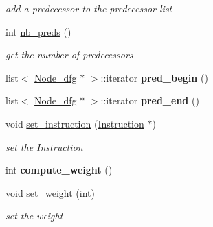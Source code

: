 \begin{DoxyCompactItemize}
\begin{DoxyCompactList}\small\item\em add a predecessor to the predecessor list \end{DoxyCompactList}\item 
\mbox{\label{class_node__dfg_adef5e6e3362133f6adb38d404c8d8cf6}} 
int \mbox{\hyperlink{class_node__dfg_adef5e6e3362133f6adb38d404c8d8cf6}{nb\+\_\+preds}} ()
\begin{DoxyCompactList}\small\item\em get the number of predecessors \end{DoxyCompactList}\item 
\mbox{\label{class_node__dfg_a769af0d7836679d6ee9abcc55d399887}} 
list$<$ \mbox{\hyperlink{class_node__dfg}{Node\+\_\+dfg}} $\ast$ $>$\+::iterator {\bfseries pred\+\_\+begin} ()
\item 
\mbox{\label{class_node__dfg_a86fc141e0697ae944900625212579957}} 
list$<$ \mbox{\hyperlink{class_node__dfg}{Node\+\_\+dfg}} $\ast$ $>$\+::iterator {\bfseries pred\+\_\+end} ()
\item 
\mbox{\label{class_node__dfg_a83747917d9c87b11633779731bcda162}} 
void \mbox{\hyperlink{class_node__dfg_a83747917d9c87b11633779731bcda162}{set\+\_\+instruction}} (\mbox{\hyperlink{class_instruction}{Instruction}} $\ast$)
\begin{DoxyCompactList}\small\item\em set the \mbox{\hyperlink{class_instruction}{Instruction}} \end{DoxyCompactList}\item 
\mbox{\label{class_node__dfg_a395b778a0b23ae2bcfd6081d84661239}} 
int {\bfseries compute\+\_\+weight} ()
\item 
\mbox{\label{class_node__dfg_af23f48b1521a90178cc5c9a59da3ab3c}} 
void \mbox{\hyperlink{class_node__dfg_af23f48b1521a90178cc5c9a59da3ab3c}{set\+\_\+weight}} (int)
\begin{DoxyCompactList}\small\item\em set the weight \end{DoxyCompactList}\item 
\mbox{\label{class_node__dfg_a561e80f51cb9a71b22f22e8d2e6685de}} 

\end{DoxyCompactItemize}
